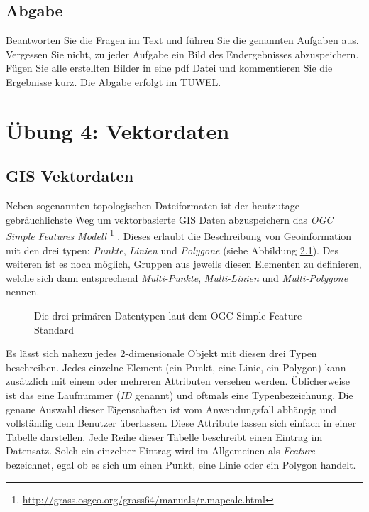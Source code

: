 \documentclass[a4paper,12pt,ngerman]{sphinxmanual}
\begin{document}
\section{Abgabe}
\label{uebung3:abgabe}
Beantworten Sie die Fragen im Text und führen Sie die genannten Aufgaben aus. Vergessen Sie nicht, zu jeder Aufgabe ein Bild des Endergebnisses abzuspeichern. Fügen Sie alle erstellten Bilder in eine pdf Datei und kommentieren Sie die Ergebnisse kurz. Die Abgabe erfolgt im TUWEL.


\chapter{Übung 4: Vektordaten}
\label{uebung4:ubung-4-vektordaten}\label{uebung4::doc}

\section{GIS Vektordaten}
\label{uebung4:gis-vektordaten}
Neben sogenannten topologischen Dateiformaten ist der heutzutage gebräuchlichste Weg um vektorbasierte GIS Daten abzuspeichern das \emph{OGC Simple Features Modell} \footnote{
\href{http://grass.osgeo.org/grass64/manuals/r.mapcalc.html}{http://grass.osgeo.org/grass64/manuals/r.mapcalc.html}
} .
Dieses erlaubt die Beschreibung von Geoinformation mit den drei typen: \emph{Punkte}, \emph{Linien} und \emph{Polygone} (siehe Abbildung \hyperref[uebung4:figvector]{ \ref*{uebung4:figvector}}). Des weiteren ist es noch möglich, Gruppen aus jeweils diesen Elementen zu definieren, welche sich dann entsprechend \emph{Multi-Punkte}, \emph{Multi-Linien} und \emph{Multi-Polygone} nennen.
\begin{figure}[htbp]
\centering
\capstart

\caption{Die drei primären Datentypen laut dem OGC Simple Feature Standard}\label{uebung4:figvector}\end{figure}

Es lässt sich nahezu jedes 2-dimensionale Objekt mit diesen drei Typen beschreiben.
Jedes einzelne Element (ein Punkt, eine Linie, ein Polygon) kann zusätzlich mit einem oder mehreren Attributen versehen werden. Üblicherweise ist das eine Laufnummer (\emph{ID} genannt) und oftmals eine Typenbezeichnung. Die genaue Auswahl dieser Eigenschaften ist vom Anwendungsfall abhängig und vollständig dem Benutzer überlassen.
Diese Attribute lassen sich einfach in einer Tabelle darstellen. Jede Reihe dieser Tabelle beschreibt einen Eintrag im Datensatz. Solch ein einzelner Eintrag wird im Allgemeinen als \emph{Feature} bezeichnet, egal ob es sich um einen Punkt, eine Linie oder ein Polygon handelt.
\end{document}
